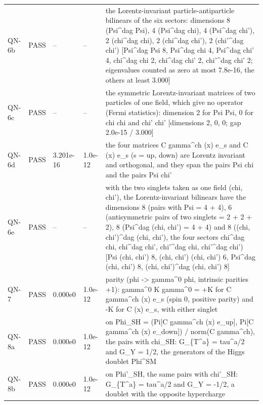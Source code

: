 \documentclass[aps,prd,onecolumn,superscriptaddress,nofootinbib,floatfix,longbibliography]{revtex4-2}
\begin{document}
\begin{longtable}{p{}p{}p{}p{}p{}}
QN-6b & PASS & -- & -- & the Lorentz-invariant particle-antiparticle bilinears of the six sectors: dimensions 8 (Psi\textasciicircum{}dag Psi), 4 (Psi\textasciicircum{}dag chi), 4 (Psi\textasciicircum{}dag chi'), 2 (chi\textasciicircum{}dag chi), 2 (chi\textasciicircum{}dag chi'), 2 (chi'\textasciicircum{}dag chi') [Psi\textasciicircum{}dag Psi 8, Psi\textasciicircum{}dag chi 4, Psi\textasciicircum{}dag chi' 4, chi\textasciicircum{}dag chi 2, chi\textasciicircum{}dag chi' 2, chi'\textasciicircum{}dag chi' 2; eigenvalues counted as zero at most 7.8e-16, the others at least 3.000] \\
QN-6c & PASS & -- & -- & the symmetric Lorentz-invariant matrices of two particles of one field, which give no operator (Fermi statistics): dimension 2 for Psi Psi, 0 for chi chi and chi' chi' [dimensions 2, 0, 0; gap 2.0e-15 / 3.000] \\
QN-6d & PASS & 3.201e-16 & 1.0e-12 & the four matrices C gamma\textasciicircum{}ch (x) e\_s and C (x) e\_s (s = up, down) are Lorentz invariant and orthogonal, and they span the pairs Psi chi and the pairs Psi chi' \\
QN-6e & PASS & -- & -- & with the two singlets taken as one field (chi, chi'), the Lorentz-invariant bilinears have the dimensions 8 (pairs with Psi = 4 + 4), 6 (antisymmetric pairs of two singlets = 2 + 2 + 2), 8 (Psi\textasciicircum{}dag (chi, chi') = 4 + 4) and 8 ((chi, chi')\textasciicircum{}dag (chi, chi'), the four sectors chi\textasciicircum{}dag chi, chi\textasciicircum{}dag chi', chi'\textasciicircum{}dag chi, chi'\textasciicircum{}dag chi') [Psi (chi, chi') 8, (chi, chi') (chi, chi') 6, Psi\textasciicircum{}dag (chi, chi') 8, (chi, chi')\textasciicircum{}dag (chi, chi') 8] \\
QN-7 & PASS & 0.000e0 & 1.0e-12 & parity (phi -\textgreater{} gamma\textasciicircum{}0 phi, intrinsic parities +1): gamma\textasciicircum{}0 K gamma\textasciicircum{}0 = +K for C gamma\textasciicircum{}ch (x) e\_s (spin 0, positive parity) and -K for C (x) e\_s, with either singlet \\
QN-8a & PASS & 0.000e0 & 1.0e-12 & on Phi\_SH = (Pi[C gamma\textasciicircum{}ch (x) e\_up], Pi[C gamma\textasciicircum{}ch (x) e\_down]) / norm(C gamma\textasciicircum{}ch), the pairs with chi\_SH: G\_\{T\textasciicircum{}a\} = tau\textasciicircum{}a/2 and G\_Y = 1/2, the generators of the Higgs doublet Phi\textasciicircum{}SM \\
QN-8b & PASS & 0.000e0 & 1.0e-12 & on Phi'\_SH, the same pairs with chi'\_SH: G\_\{T\textasciicircum{}a\} = tau\textasciicircum{}a/2 and G\_Y = -1/2, a doublet with the opposite hypercharge \\

\end{longtable}
\end{document}
